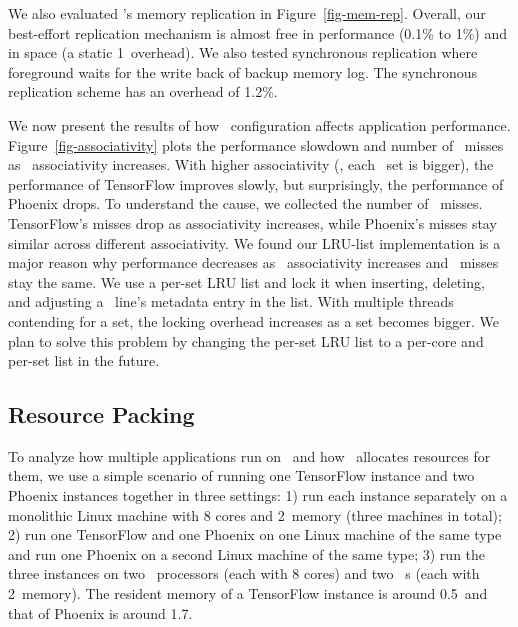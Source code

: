 \documentclass[10pt,times,twocolumn]{z2-article}
\begin{document}
{{{{{{{We also evaluated \lego's memory replication in Figure~\ref{fig-mem-rep}.
Overall, our best-effort replication mechanism is almost free in performance (0.1\% to 1\%) and in space (a static 1\MB\ overhead).
We also tested synchronous replication where foreground waits for the write back of backup memory log.
The synchronous replication scheme has an overhead of 1.2\%.




We now present the results of how \excache\ configuration affects application performance.
Figure~\ref{fig-associativity} plots the performance slowdown and number of \excache\ misses as \excache\ associativity increases.
With higher associativity (\ie, each \excache\ set is bigger), the performance of TensorFlow improves slowly,
but surprisingly, the performance of Phoenix drops.
To understand the cause, we collected the number of \excache\ misses. 
TensorFlow's misses drop as associativity increases, 
while Phoenix's misses stay similar across different associativity.
We found our LRU-list implementation is a major reason why performance decreases as \excache\ associativity increases and \excache\ misses stay the same.
We use a per-set LRU list and lock it when inserting, deleting, and adjusting a \excache\ line's metadata entry in the list.
With multiple threads contending for a set, the locking overhead increases as a set becomes bigger.
We plan to solve this problem by changing the per-set LRU list to a per-core and per-set list in the future.
\fi

\subsection{Resource Packing}
\label{sec:cost}
To analyze how multiple applications run on \lego\ and how \lego\ allocates resources for them,
we use a simple scenario of running one TensorFlow instance and two Phoenix instances together in three settings:
1) run each instance separately on a monolithic Linux machine with 8 cores and 2\GB\ memory (three machines in total);
2) run one TensorFlow and one Phoenix on one Linux machine of the same type and 
run one Phoenix on a second Linux machine of the same type;
3) run the three instances on two \lego\ processors (each with 8 cores) and two \lego\ \mcomponent s (each with 2\GB\ memory).
The resident memory of a TensorFlow instance is around 0.5\GB\ and that of Phoenix is around 1.7\GB.

}}}}}}}
\end{document}
